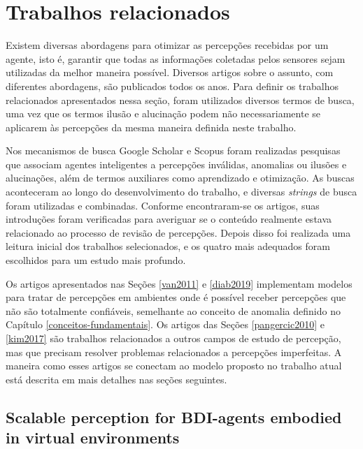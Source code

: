 \chapter{Trabalhos relacionados}

\label{chapter:relacionados}

Existem diversas abordagens para otimizar as percepções recebidas por um agente, isto é, garantir que todas as informações coletadas pelos sensores sejam utilizadas da melhor maneira possível. Diversos artigos sobre o assunto, com diferentes abordagens, são publicados todos os anos. Para definir os trabalhos relacionados apresentados nessa seção, foram utilizados diversos termos de busca, uma vez que os termos ilusão e alucinação podem não necessariamente se aplicarem às percepções da mesma maneira definida neste trabalho.

Nos mecanismos de busca Google Scholar e Scopus foram realizadas pesquisas que associam agentes inteligentes a percepções inválidas, anomalias ou ilusões e alucinações, além de termos auxiliares como aprendizado e otimização. As buscas aconteceram ao longo do desenvolvimento do trabalho, e diversas \textit{strings} de busca foram utilizadas e combinadas. Conforme encontraram-se os artigos, suas introduções foram verificadas para averiguar se o conteúdo realmente estava relacionado ao processo de revisão de percepções. Depois disso foi realizada uma leitura inicial dos trabalhos selecionados, e os quatro mais adequados foram escolhidos para um estudo mais profundo.

Os artigos apresentados nas Seções \ref{van2011} e \ref{diab2019} implementam modelos para tratar de percepções em ambientes onde é possível receber percepções que não são totalmente confiáveis, semelhante ao conceito de anomalia definido no Capítulo \ref{conceitos-fundamentais}. Os artigos das Seções \ref{pangercic2010} e \ref{kim2017} são trabalhos relacionados a outros campos de estudo de percepção, mas que precisam resolver problemas relacionados a percepções imperfeitas. A maneira como esses artigos se conectam ao modelo proposto no trabalho atual está descrita em mais detalhes nas seções seguintes.

\section{Scalable perception for BDI-agents embodied in virtual environments \cite{van2011scalable}}

